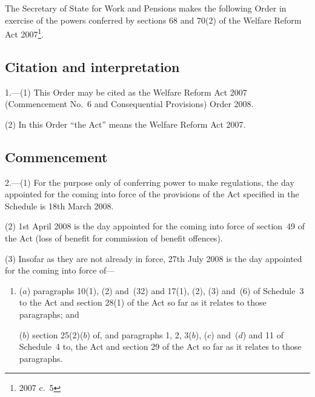 \documentclass[12pt,a4paper]{article}
\title{\regstitle}
\author{S.I.\ 2008 No.\ 787 (C.~36)}
\date{Made
17th March 2008
}
\begin{document}
\maketitle

\noindent
The Secretary of State for Work and Pensions makes the following Order in exercise of the powers conferred by sections 68 and 70(2) of the Welfare Reform Act 2007\footnote{2007 c.\ 5}. 

{\sloppy

\tableofcontents

}

\bigskip

\setcounter{secnumdepth}{-2}

\subsection[1. Citation and interpretation]{Citation and interpretation}

1.---(1)  This Order may be cited as the Welfare Reform Act 2007 (Commencement No.\ 6 and Consequential Provisions) Order 2008.

(2) In this Order “the Act” means the Welfare Reform Act 2007.

\subsection[2. Commencement]{Commencement}

2.---(1)  For the purpose only of conferring power to make regulations, the day appointed for the coming into force of the provisions of the Act specified in the Schedule is 18th March 2008.

(2) 1st April 2008 is the day appointed for the coming into force of section~49 of the Act (loss of benefit for commission of benefit offences).

(3) Insofar as they are not already in force, 27th July 2008 is the day appointed for the coming into force of—
\begin{enumerate}\item[]
($a$) paragraphs 10(1), (2) and~(32) and 17(1), (2), (3) and~(6) of Schedule~3 to the Act and section 28(1) of the Act so far as it relates to those paragraphs; and

($b$) section 25(2)($b$)  of, and paragraphs 1, 2, 3($b$), ($c$)  and~($d$)  and 11 of Schedule~4 to, the Act and section 29 of the Act so far as it relates to those paragraphs.
\end{enumerate}
\end{document}
